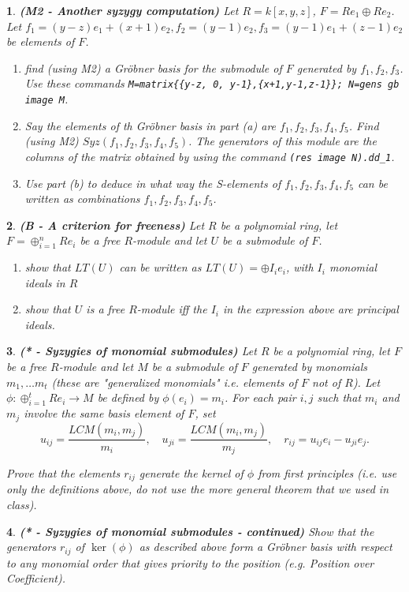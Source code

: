 \documentclass[11pt]{article}
\theoremstyle{problem}
\newtheorem{p}{}
\newcommand{\GB}{Gr\"obner basis }
\begin{document}
\begin{p} {\bf (M2 - Another syzygy computation)}
Let $R=k[x,y,z]$,  $F=Re_1 \oplus Re_2$. Let $f_1=(y-z)e_1+(x+1)e_2, f_2=(y-1)e_2, f_3=(y-1)e_1+(z-1)e_2$ be elements of $F$. 
\begin{enumerate}
\item find (using M2) a \GB for the submodule of $F$ generated by $f_1,f_2,f_3$. Use these commands
\texttt{M=matrix\{\{y-z, 0, y-1\},\{x+1,y-1,z-1\}\}; N=gens gb image M}.
\item Say the elements of th \GB in part (a) are $f_1,f_2,f_3, f_4, f_5$. Find (using M2) $Syz(f_1,f_2,f_3, f_4, f_5)$. The generators of this module are the columns of the matrix obtained by using the command \texttt{(res image N).dd\_1}.
\item Use part (b) to deduce in what way the S-elements of $f_1,f_2,f_3, f_4, f_5$ can be written as combinations $f_1,f_2,f_3, f_4, f_5$.
\end{enumerate}
\end{p}


\begin{p}{\bf (B - A criterion for freeness)}
Let $R$ be a polynomial ring, let $F=\oplus_{i=1}^n Re_i$ be a free $R$-module and let $U$ be a submodule of $F$.
\begin{enumerate}
\item show that $LT(U)$ can be written as $LT(U)=\oplus I_ie_i$, with $I_i$ monomial ideals in $R$
\item show that $U$ is a free $R$-module iff the $I_i$ in the expression above are principal ideals.
\end{enumerate}
\end{p}


\begin{p} {\bf (* - Syzygies of monomial submodules)}
Let $R$ be a polynomial ring, let $F$ be a free $R$-module and let $M$ be a submodule of $F$ generated by  monomials $m_1,\ldots m_t$ (these are "generalized monomials"  i.e. elements of $F$ not of $R$). Let $\phi:\oplus_{i=1}^t Re_i \to M$ be defined by $\phi(e_i)=m_i$. For each pair $i,j$ such that $m_i$ and $m_j$ involve the same basis element of $F$, set 
$$u_{ij}=\frac{LCM(m_i,m_j)}{m_i}, \quad u_{ji}=\frac{LCM(m_i,m_j)}{m_j}, \quad r_{ij}=u_{ij}e_i-u_{ji}e_j.$$

Prove that the elements $r_{ij}$ generate the kernel of $\phi$ from first principles (i.e. use only the definitions above, do not use the more general theorem that we used in class).
\end{p}

\begin{p} {\bf (* - Syzygies of monomial submodules - continued)}
 Show that the generators $r_{ij}$ of $\ker(\phi)$ as described above form a \GB with respect to any monomial order that gives priority to the position (e.g. Position over Coefficient).
\end{p}
 
\end{document}
